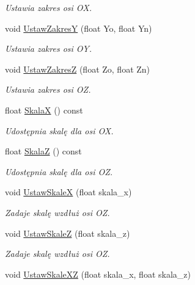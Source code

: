 \begin{DoxyCompactItemize}
\begin{DoxyCompactList}\small\item\em Ustawia zakres osi {\itshape OX}. \end{DoxyCompactList}\item 
void \mbox{\hyperlink{class_pz_g_1_1_lacze_do_g_n_u_plota_a54c6e9cf9ab2eae479451fd953c2717c}{Ustaw\+ZakresY}} (float Yo, float Yn)
\begin{DoxyCompactList}\small\item\em Ustawia zakres osi {\itshape OY}. \end{DoxyCompactList}\item 
void \mbox{\hyperlink{class_pz_g_1_1_lacze_do_g_n_u_plota_a1dbbb2b86fb13b8632e6bad9df2a82e3}{Ustaw\+ZakresZ}} (float Zo, float Zn)
\begin{DoxyCompactList}\small\item\em Ustawia zakres osi {\itshape OZ}. \end{DoxyCompactList}\item 
float \mbox{\hyperlink{class_pz_g_1_1_lacze_do_g_n_u_plota_a4b1eb252fd785a5aeff938e7b2dce2b1}{SkalaX}} () const
\begin{DoxyCompactList}\small\item\em Udostępnia skalę dla osi {\itshape OX}. \end{DoxyCompactList}\item 
float \mbox{\hyperlink{class_pz_g_1_1_lacze_do_g_n_u_plota_a44f922ccbc508d6cd7809c669238dae3}{SkalaZ}} () const
\begin{DoxyCompactList}\small\item\em Udostępnia skalę dla osi {\itshape OZ}. \end{DoxyCompactList}\item 
void \mbox{\hyperlink{class_pz_g_1_1_lacze_do_g_n_u_plota_a855b8338bfe3e5d294d719f24b11090e}{Ustaw\+SkaleX}} (float skala\+\_\+x)
\begin{DoxyCompactList}\small\item\em Zadaje skalę wzdłuż osi {\itshape OZ}. \end{DoxyCompactList}\item 
void \mbox{\hyperlink{class_pz_g_1_1_lacze_do_g_n_u_plota_ab0486db3166d8db6580a221079af241f}{Ustaw\+SkaleZ}} (float skala\+\_\+z)
\begin{DoxyCompactList}\small\item\em Zadaje skalę wzdłuż osi {\itshape OZ}. \end{DoxyCompactList}\item 
void \mbox{\hyperlink{class_pz_g_1_1_lacze_do_g_n_u_plota_a4308151b54e105d302803146a3238699}{Ustaw\+Skale\+XZ}} (float skala\+\_\+x, float skala\+\_\+z)

\end{DoxyCompactItemize}
